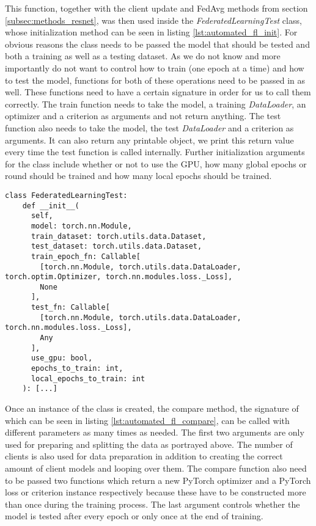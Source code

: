This function, together with the client update and FedAvg methods from section \ref{subsec:methods_resnet}, was then used inside the \textit{FederatedLearningTest} class, whose initialization method can be seen in listing \ref{lst:automated_fl_init}. For obvious reasons the class needs to be passed the model that should be tested and both a training as well as a testing dataset. As we do not know and more importantly do not want to control how to train (one epoch at a time) and how to test the model, functions for both of these operations need to be passed in as well. These functions need to have a certain signature in order for us to call them correctly. The train function needs to take the model, a training \textit{DataLoader}, an optimizer and a criterion as arguments and not return anything. The test function also needs to take the model, the test \textit{DataLoader} and a criterion as arguments. It can also return any printable object, we print this return value every time the test function is called internally.
Further initialization arguments for the class include whether or not to use the GPU, how many global epochs or round should be trained and how many local epochs should be trained. 

\begin{lstlisting}[language=CustomPython, style=colorEX, caption=Automated federation learning class initialization, captionpos=t, label=lst:automated_fl_init]
  class FederatedLearningTest:
    def __init__(
      self,
      model: torch.nn.Module,
      train_dataset: torch.utils.data.Dataset,
      test_dataset: torch.utils.data.Dataset,
      train_epoch_fn: Callable[
        [torch.nn.Module, torch.utils.data.DataLoader, torch.optim.Optimizer, torch.nn.modules.loss._Loss], 
        None
      ], 
      test_fn: Callable[
        [torch.nn.Module, torch.utils.data.DataLoader, torch.nn.modules.loss._Loss],
        Any
      ],
      use_gpu: bool,
      epochs_to_train: int,
      local_epochs_to_train: int
    ): [...]
\end{lstlisting}

Once an instance of the class is created, the compare method, the signature of which can be seen in listing \ref{lst:automated_fl_compare}, can be called with different parameters as many times as needed. The first two arguments are only used for preparing and splitting the data as portrayed above. The number of clients is also used for data preparation in addition to creating the correct amount of client models and looping over them. The compare function also need to be passed two functions which return a new PyTorch optimizer and a PyTorch loss or criterion instance respectively because these have to be constructed more than once during the training process. The last argument controls whether the model is tested after every epoch or only once at the end of training.

